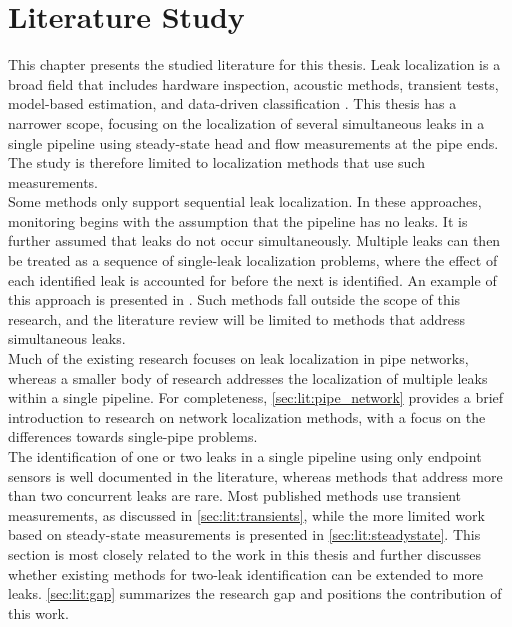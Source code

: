 \chapter{Literature Study}
\label{chap:literature}

This chapter presents the studied literature for this thesis. Leak localization is a broad field that includes hardware inspection, acoustic methods, transient tests, model-based estimation, and data-driven classification \cite{hu2021review}. This thesis has a narrower scope, focusing on the localization of several simultaneous leaks in a single pipeline using steady-state head and flow measurements at the pipe ends. The study is therefore limited to localization methods that use such measurements.\\

Some methods only support sequential leak localization. In these approaches, monitoring begins with the assumption that the pipeline has no leaks. It is further assumed that leaks do not occur simultaneously. Multiple leaks can then be treated as a sequence of single-leak localization problems, where the effect of each identified leak is accounted for before the next is identified. An example of this approach is presented in \cite{verde2005}. Such methods fall outside the scope of this research, and the literature review will be limited to methods that address simultaneous leaks.\\

Much of the existing research focuses on leak localization in pipe networks, whereas a smaller body of research addresses the localization of multiple leaks within a single pipeline. For completeness, \autoref{sec:lit:pipe_network} provides a brief introduction to research on network localization methods, with a focus on the differences towards single-pipe problems.\\

The identification of one or two leaks in a single pipeline using only endpoint sensors is well documented in the literature, whereas methods that address more than two concurrent leaks are rare. Most published methods use transient measurements, as discussed in \autoref{sec:lit:transients}, while the more limited work based on steady-state measurements is presented in \autoref{sec:lit:steadystate}. This section is most closely related to the work in this thesis and further discusses whether existing methods for two-leak identification can be extended to more leaks. \autoref{sec:lit:gap} summarizes the research gap and positions the contribution of this work.

